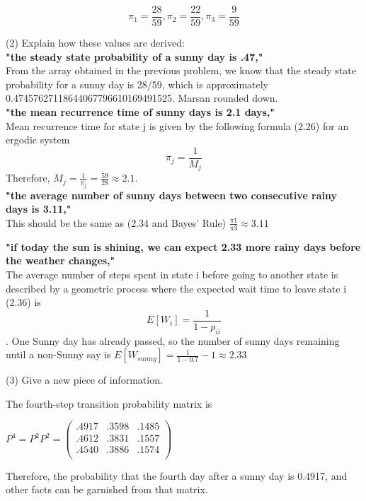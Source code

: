 \documentclass[10pt,fullpage]{article}
\begin{document}
\begin{equation}
\pi_{1} = \frac{28}{59}, \pi_{2} = \frac{22}{59}, \pi_{3} = \frac{9}{59}
\end{equation}

\newpage

(2) Explain how these values are derived:\\

\textbf{"the steady state probability of a sunny day is .47,"}\\
From the array obtained in the previous problem, we know that the steady state probability for a sunny day is 28/59, which is approximately 0.47457627118644067796610169491525. Marsan rounded down.\\

\textbf{"the mean recurrence time of sunny days is 2.1 days,"}\\
Mean recurrence time for state j is given by the following formula (2.26) for an ergodic system \begin{equation}\pi_{j}=\frac{1}{M_{j}}\end{equation} Therefore, $ M_{j} = \frac{1}{\pi_{j}} = \frac{59}{28} \approx 2.1$.\\

\textbf{"the average number of sunny days between two consecutive rainy days is 3.11,"}\\
This should be the same as (2.34 and Bayes' Rule) $\frac{\pi{1}}{\pi{3}} \approx 3.11$

\textbf{"if today the sun is shining, we can expect 2.33 more rainy days before the weather changes,"}\\
The average number of steps spent in state i before going to another state is described by a geometric process where the expected wait time to leave state i (2.36) is \begin{equation}E[W_{i}] = \frac{1}{1 - p_{ii}}\end{equation}. One Sunny day has already passed, so the number of sunny days remaining until a non-Sunny say is $E[W_{sunny}] = \frac{1}{1 - 0.7} - 1 \approx 2.33 $


(3) Give a new piece of information.

The fourth-step transition probability matrix is

$P^{4} = P^{2}P^{2} = \left(%
\begin{array}{ccc}
  .4917 & .3598 & .1485 \\
  .4612 & .3831 & .1557 \\
  .4540 & .3886 & .1574 \\
 \end{array}%
\right)$

Therefore, the probability that the fourth day after a sunny day is 0.4917, and other facts can be garnished from that matrix.
\end{document}

